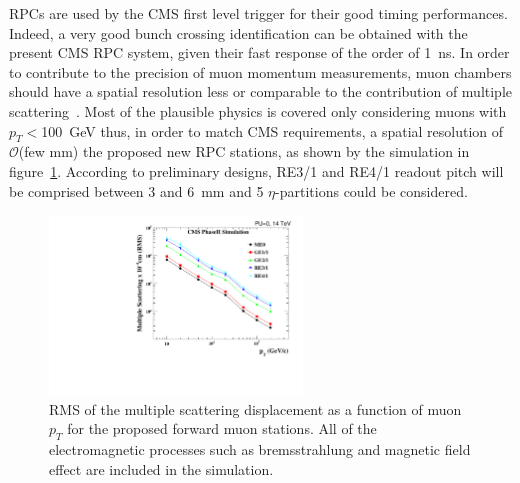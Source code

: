 \acsp{RPC} are used by the \acs{CMS} first level trigger for their good timing performances. Indeed, a very good bunch crossing identification can be obtained with the present \acs{CMS} \acs{RPC} system, given their fast response of the order of \SI{1}{ns}. In order to contribute to the precision of muon momentum measurements, muon chambers should have a spatial resolution less or comparable to the contribution of multiple scattering~\cite{MUONTDR}. Most of the plausible physics is covered only considering muons with $p_T<$\SI{100}{GeV} thus, in order to match \acs{CMS} requirements, a spatial resolution of $\mathcal{O}$(few $\mathrm{mm}$) the proposed new \acs{RPC} stations, as shown by the simulation in figure~\ref{fig:MultiScat}. According to preliminary designs, \acs{RE3/1} and \acs{RE4/1} readout pitch will be comprised between 3 and \SI{6}{mm} and 5 $\eta$-partitions could be considered.

\begin{figure}[ht!]
	\centering
	\includegraphics[width=0.6\textwidth]{fig/MS_allstations.pdf}
	\caption{\label{fig:MultiScat}  \acs{RMS} of the multiple scattering displacement as a function of muon $p_T$ for the  proposed forward muon stations. All of the electromagnetic processes such as bremsstrahlung and magnetic field effect are included in the simulation.}
\end{figure}

\clearpage{\pagestyle{empty}\cleardoublepage}
